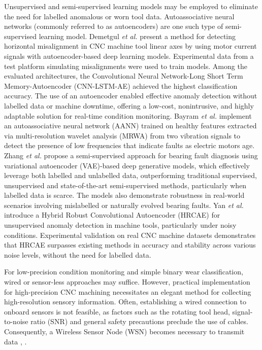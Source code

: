 \documentclass[../main.tex]{subfiles}
\begin{document}
Unsupervised and semi-supervised learning models may be employed to eliminate the need for labelled anomalous or worn tool data. Autoassociative neural networks (commonly referred to as autoencoders) are one such type of semi-supervised learning model. Demetgul \textit{et al.} \cite{RN27} present a method for detecting horizontal misalignment in CNC machine tool linear axes by using motor current signals with autoencoder-based deep learning models. Experimental data from a test platform simulating misalignments were used to train models. Among the evaluated architectures, the Convolutional Neural Network-Long Short Term Memory-Autoencoder (CNN-LSTM-AE) achieved the highest classification accuracy. The use of an autoencoder enabled effective anomaly detection without labelled data or machine downtime, offering a low-cost, nonintrusive, and highly adaptable solution for real-time condition monitoring. 
Bayram \textit{et al.} \cite{RN4} implement an autoassociative neural network (AANN) trained on healthy features extracted via multi-resolution wavelet analysis (MRWA) from two vibration signals to detect the presence of low frequencies that indicate faults as electric motors age. Zhang \textit{et al.} \cite{RN25} propose a semi-supervised approach for bearing fault diagnosis using variational autoencoder (VAE)-based deep generative models, which effectively leverage both labelled and unlabelled data, outperforming traditional supervised, unsupervised and state-of-the-art semi-supervised methods, particularly when labelled data is scarce. The models also demonstrate robustness in real-world scenarios involving mislabelled or naturally evolved bearing faults. Yan \textit{et al.} \cite{RN26} introduce a Hybrid Robust Convolutional Autoencoder (HRCAE) for unsupervised anomaly detection in machine tools, particularly under noisy conditions. Experimental validation on real CNC machine datasets demonstrates that HRCAE surpasses existing methods in accuracy and stability across various noise levels, without the need for labelled data.

For low-precision condition monitoring and simple binary wear classification, wired or sensor-less approaches may suffice. However, practical implementation for high-precision CNC machining necessitates an elegant method for collecting high-resolution sensory information. Often, establishing a wired connection to onboard sensors is not feasible, as factors such as the rotating tool head, signal-to-noise ratio (SNR) and general safety precautions preclude the use of cables. Consequently, a Wireless Sensor Node (WSN) becomes necessary to transmit data \cite{RN29}, \cite{RN28}.
\end{document}
